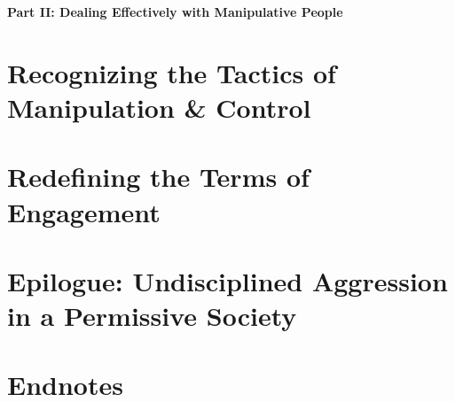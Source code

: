 \documentclass{article}
\numberwithin{equation}{section}
\begin{document}

\begin{center}\Large\bf
	Part II: Dealing Effectively with Manipulative People
\end{center}

\section{Recognizing the Tactics of Manipulation \& Control}


\section{Redefining the Terms of Engagement}


\section{Epilogue: Undisciplined Aggression in a Permissive Society}


\section{Endnotes}


\printbibliography[heading=bibintoc]
	
\end{document}
